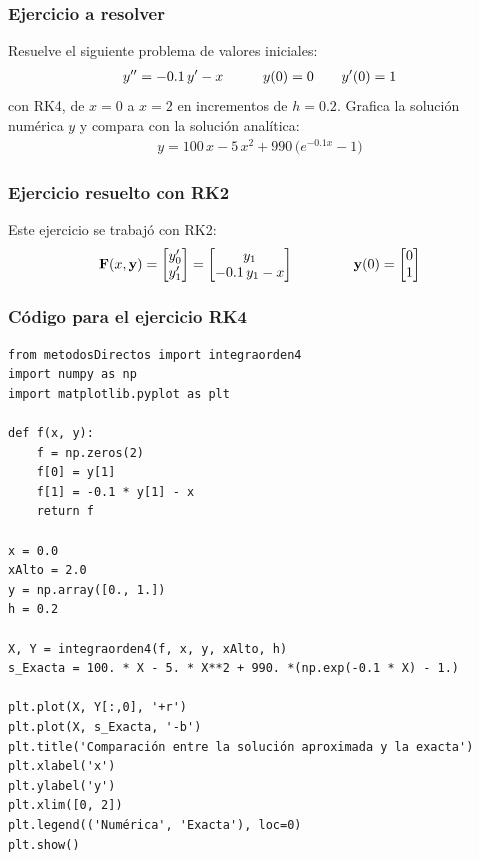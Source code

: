 \documentclass[12pt]{beamer}
\begin{document}
\begin{frame}
\frametitle{Ejercicio a resolver}
Resuelve el siguiente problema de valores iniciales:
\pause
\begin{align*}
{y}^{\prime \prime} = -0.1 \, {y}^{\prime} - x \hspace{1cm} y (0) = 0 \hspace{0.7cm} {y}^{\prime} (0) = 1
\end{align*}
con RK4, de $x = 0$ a $x = 2$ en incrementos de $h = 0.2$. \pause Grafica la solución numérica $y$ y compara con la solución analítica:
\pause
\begin{align*}
y = 100 \, x - 5 \, x^{2} + 990 \, \big( e^{-0.1 x} - 1 \big)
\end{align*}
\end{frame}
\begin{frame}
\frametitle{Ejercicio resuelto con RK2}
Este ejercicio se trabajó con RK2:
\pause
\begin{align*}
\mathbf{F} (x, \mathbf{y}) = 
\begin{bmatrix}
{y}^{\prime}_{0} \\
{y}^{\prime}_{1}
\end{bmatrix} =
\begin{bmatrix}
y_{1} \\
-0.1 \, y_{1} - x
\end{bmatrix}
\hspace{1.5cm}
\mathbf{y} (0) = 
\begin{bmatrix}
0 \\
1
\end{bmatrix}
\end{align*}
\end{frame}
\begin{frame}
\frametitle{Código para el ejercicio RK4}
\begin{lstlisting}[caption=Código para resolver el ejercicio con el método RK4]
from metodosDirectos import integraorden4
import numpy as np
import matplotlib.pyplot as plt

def f(x, y):
	f = np.zeros(2)
	f[0] = y[1]
	f[1] = -0.1 * y[1] - x
	return f

x = 0.0
xAlto = 2.0
y = np.array([0., 1.])
h = 0.2

X, Y = integraorden4(f, x, y, xAlto, h)
s_Exacta = 100. * X - 5. * X**2 + 990. *(np.exp(-0.1 * X) - 1.)

plt.plot(X, Y[:,0], '+r')
plt.plot(X, s_Exacta, '-b')
plt.title('Comparación entre la solución aproximada y la exacta')
plt.xlabel('x')
plt.ylabel('y')
plt.xlim([0, 2])
plt.legend(('Numérica', 'Exacta'), loc=0)
plt.show()
\end{lstlisting}
\end{frame}
\end{document}
